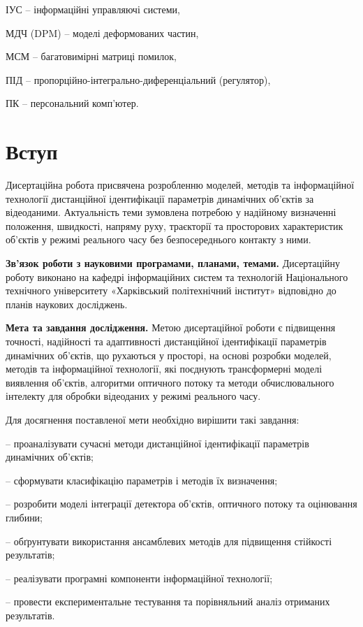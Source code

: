 \documentclass[
]{article}
\begin{document}
ІУС -- інформаційні управляючі системи,

МДЧ (DPM) -- моделі деформованих частин,

МСМ -- багатовимірні матриці помилок,

ПІД -- пропорційно-інтегрально-диференціальний (регулятор),

ПК -- персональний комп'ютер.

\section{\texorpdfstring{\hfill\break
Вступ}{ Вступ}}\label{ux432ux441ux442ux443ux43f}

Дисертаційна робота присвячена розробленню моделей, методів та інформаційної технології дистанційної ідентифікації параметрів динамічних об'єктів за відеоданими. Актуальність теми зумовлена потребою у надійному визначенні положення, швидкості, напряму руху, траєкторії та просторових характеристик об'єктів у режимі реального часу без безпосереднього контакту з ними.

\textbf{Зв'язок роботи з науковими програмами, планами, темами.} Дисертаційну роботу виконано на кафедрі інформаційних систем та технологій Національного технічного університету «Харківський політехнічний інститут» відповідно до планів наукових досліджень.

\textbf{Мета та завдання дослідження.} Метою дисертаційної роботи є підвищення точності, надійності та адаптивності дистанційної ідентифікації параметрів динамічних об'єктів, що рухаються у просторі, на основі розробки моделей, методів та інформаційної технології, які поєднують трансформерні моделі виявлення об'єктів, алгоритми оптичного потоку та методи обчислювального інтелекту для обробки відеоданих у режимі реального часу.

Для досягнення поставленої мети необхідно вирішити такі завдання:

-- проаналізувати сучасні методи дистанційної ідентифікації параметрів динамічних об'єктів;

-- сформувати класифікацію параметрів і методів їх визначення;

-- розробити моделі інтеграції детектора об'єктів, оптичного потоку та оцінювання глибини;

-- обґрунтувати використання ансамблевих методів для підвищення стійкості результатів;

-- реалізувати програмні компоненти інформаційної технології;

-- провести експериментальне тестування та порівняльний аналіз отриманих результатів.
\end{document}

